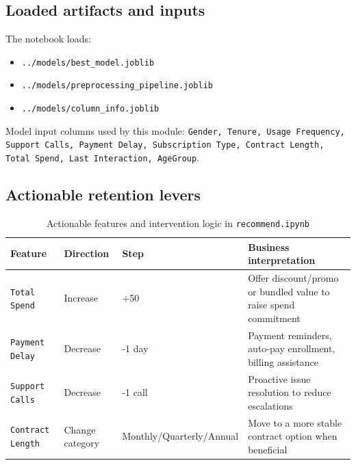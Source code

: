 \documentclass[11pt]{article}
\begin{document}
\subsection*{Loaded artifacts and inputs}
The notebook loads:
\begin{itemize}
    \item \texttt{../models/best\_model.joblib}
    \item \texttt{../models/preprocessing\_pipeline.joblib}
    \item \texttt{../models/column\_info.joblib}
\end{itemize}

Model input columns used by this module:
\texttt{Gender, Tenure, Usage Frequency, Support Calls, Payment Delay, Subscription Type, Contract Length, Total Spend, Last Interaction, AgeGroup}.

\subsection*{Actionable retention levers}
\begin{table}[H]
\centering
\begin{tabular}{p{3.8cm} p{2.2cm} p{2.8cm} p{6.0cm}}
\toprule
\textbf{Feature} & \textbf{Direction} & \textbf{Step} & \textbf{Business interpretation} \\
\midrule
\texttt{Total Spend} & Increase & +50 & Offer discount/promo or bundled value to raise spend commitment \\
\texttt{Payment Delay} & Decrease & -1 day & Payment reminders, auto-pay enrollment, billing assistance \\
\texttt{Support Calls} & Decrease & -1 call & Proactive issue resolution to reduce escalations \\
\texttt{Contract Length} & Change category & Monthly/Quarterly/Annual & Move to a more stable contract option when beneficial \\
\bottomrule
\end{tabular}
\caption{Actionable features and intervention logic in \texttt{recommend.ipynb}}
\end{table}
\end{document}
